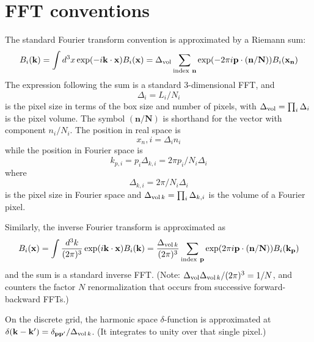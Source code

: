 \documentclass{article}
\begin{document}
\section{FFT conventions}
 
 The standard Fourier transform convention is approximated by a Riemann sum:
 \begin{equation}
   B_i(\mathbf{k}) = \int d^3x \exp(-i \mathbf{k \cdot x}) B_i(\mathbf{x}) = \Delta_{\rm vol} \sum_{\rm{index}\ \mathbf{n}} \exp(-2\pi i \mathbf{p}\cdot (\mathbf{n/N}) ) B_i(\mathbf{x_n})
 \end{equation}
 The expression following the sum is a standard 3-dimensional FFT, and
 \begin{equation}
   \Delta_i = L_i/N_i
 \end{equation}
 is the pixel size in terms of the box size and number of pixels, with $\Delta_{\rm vol} = \prod_i \Delta_i$ is the pixel volume.  The symbol $(\mathbf{n/N})$ is shorthand for the vector with component $n_i/N_i$.
The position in real space is 
 \begin{equation}
   x_n,i = \Delta_i n_i 
 \end{equation}
 while the position in Fourier space is
 \begin{equation}
   k_{p,i} = p_i \Delta_{k,i} = 2\pi p_i/N_i \Delta_i
 \end{equation}
 where
 \begin{equation}
   \Delta_{k,i} = 2\pi/N_i\Delta_i
   \end{equation}
is the pixel size in Fourier space and $\Delta_{{\rm vol}\,k} = \prod_i \Delta_{k,i}$ is the volume of a Fourier pixel.

Similarly, the inverse Fourier transform is approximated as
\begin{equation}
   B_i(\mathbf{x}) = \int \frac{d^3k}{(2\pi)^3} \exp(i \mathbf{k \cdot x}) B_i(\mathbf{k}) = \frac{\Delta_{{\rm vol}\, k}}{(2\pi)^3} \sum_{\rm{index}\ \mathbf{p}} \exp(2\pi i \mathbf{p}\cdot (\mathbf{n/N}) ) B_i(\mathbf{k_p})
 \end{equation}
 and the sum is a standard inverse FFT.  (Note: $\Delta_{{\rm vol}}\Delta_{{\rm vol}\,k}/(2\pi)^3 = 1/N$, and counters the factor $N$ renormalization that occurs from successive forward-backward FFTs.)


On the discrete grid, the harmonic space $\delta$-function is approximated at $\delta(\mathbf{k-k'}) = \delta_\mathbf{pp'} / \Delta_{{\rm vol}\, k}$.  (It integrates to unity over that single pixel.)
\end{document}
